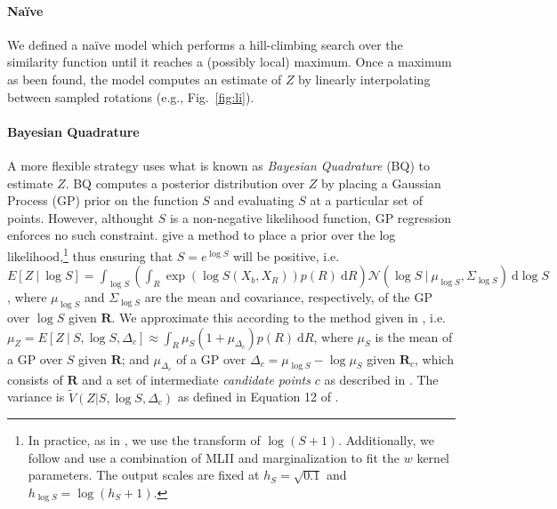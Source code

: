 \documentclass{article} %
\newcommand{\naive}[0]{na\"ive}
\newcommand{\Naive}[0]{Na\"ive}
\begin{document}
\paragraph{\Naive{}}

We defined a \naive{} model which performs a hill-climbing search over
the similarity function until it reaches a (possibly local)
maximum. Once a maximum as been found, the model computes an estimate
of $Z$ by linearly interpolating between sampled rotations (e.g.,
Fig.~\ref{fig:li}).

\paragraph{Bayesian Quadrature}

A more flexible strategy uses what is known as \emph{Bayesian
  Quadrature} (BQ) \cite{Diaconis:1988uo,OHagan:1991tx} to estimate
$Z$.  BQ computes a posterior distribution over $Z$ by placing a
Gaussian Process (GP) prior on the function $S$ and evaluating $S$ at
a particular set of points. However, althought $S$ is a non-negative
likelihood function, GP regression enforces no such
constraint. \cite{Osborne:2012tm} give a method to place a prior over
the log likelihood,\footnote{In practice, as in \cite{Osborne:2012tm},
  we use the transform of $\log(S+1)$. Additionally, we follow
  \cite{Osborne:2012tm} and use a combination of MLII and
  marginalization to fit the $w$ kernel parameters. The output scales
  are fixed at $h_S=\sqrt{0.1}$ and $h_{\log S}=\log(h_S + 1)$.} thus
ensuring that $S=e^{\log S}$ will be positive, i.e.  $E[Z\ \vert \
\log S]=\int_{\log S}\left(\int_R \exp(\log{S(X_b,X_R)})p(R)\
  \mathrm{d}R\right)\mathcal{N}\left(\log{S}\ \vert \ \mu_{\log S},
  \Sigma_{\log S}\right)\ \mathrm{d}\log S$, where $\mu_{\log S}$ and
$\Sigma_{\log S}$ are the mean and covariance, respectively, of the GP
over $\log S$ given $\mathbf{R}$. We approximate this according to the
method given in \cite{Osborne:2012tm}, i.e. $\mu_Z=E[Z\ \vert \ S,
\log S, \Delta_c] \approx \int_R \mu_{S}(1 + \mu_{\Delta_c}) p(R)\
\mathrm{d}R$, where $\mu_S$ is the mean of a GP over $S$ given
$\mathbf{R}$; and $\mu_{\Delta_c}$ of a GP over $\Delta_c=\mu_{\log S}
- \log \mu_S$ given $\mathbf{R}_c$, which consists of $\mathbf{R}$ and
a set of intermediate \emph{candidate points} $c$ as described in
\cite{Osborne:2012tm}. The variance is $\tilde{V}(Z\vert S, \log S,
\Delta_c)$ as defined in Equation 12 of \cite{Osborne:2012tm}.
\end{document}
